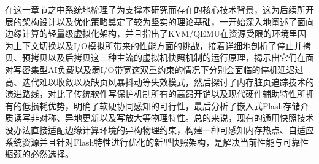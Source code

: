 在这一章节之中系统地梳理了为支撑本研究而存在的核心技术背景，这为后续所开展的架构设计以及优化策略奠定了较为坚实的理论基础，一开始深入地阐述了面向边缘计算的轻量级虚拟化架构，并且指出了KVM/QEMU在资源受限的环境里因为上下文切换以及I/O模拟所带来的性能方面的挑战，接着详细地剖析了停止并拷贝、预拷贝以及后拷贝这三种主流的虚拟机快照机制的运行原理，揭示出它们在面对写密集型AI负载以及弱I/O带宽这双重约束的情况下分别会面临的停机延迟过高、迭代难以收敛以及缺页风暴抖动等失效模式，然后探讨了内存脏页追踪技术的演进路线，对比了传统软件写保护机制所有的高昂开销以及现代硬件辅助特性所拥有的低损耗优势，明确了软硬协同感知的可行性，最后分析了嵌入式Flash存储介质读写非对称、异地更新以及写放大等物理特性。总的来说，现有的通用快照技术没办法直接适配边缘计算环境的异构物理约束，构建一种可感知内存热点、自适应系统资源并且针对Flash特性进行优化的新型快照架构，是解决当前性能与可靠性瓶颈的必然选择。


